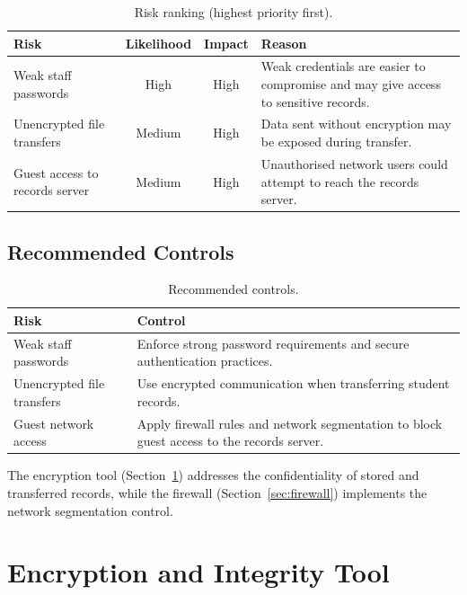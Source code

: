 \documentclass[11pt,a4paper]{article}
\begin{document}
\begin{table}[h!]
\centering
\renewcommand{\arraystretch}{1.3}
\begin{tabular}{@{}p{3.6cm} c c p{6.4cm}@{}}
\toprule
\textbf{Risk} & \textbf{Likelihood} & \textbf{Impact} & \textbf{Reason} \\
\midrule
Weak staff passwords & High & High &
  Weak credentials are easier to compromise and may give access to sensitive records. \\
Unencrypted file transfers & Medium & High &
  Data sent without encryption may be exposed during transfer. \\
Guest access to records server & Medium & High &
  Unauthorised network users could attempt to reach the records server. \\
\bottomrule
\end{tabular}
\caption{Risk ranking (highest priority first).}
\end{table}

\subsection{Recommended Controls}
\begin{table}[h!]
\centering
\renewcommand{\arraystretch}{1.3}
\begin{tabular}{@{}p{4.5cm} p{10cm}@{}}
\toprule
\textbf{Risk} & \textbf{Control} \\
\midrule
Weak staff passwords & Enforce strong password requirements and secure authentication practices. \\
Unencrypted file transfers & Use encrypted communication when transferring student records. \\
Guest network access & Apply firewall rules and network segmentation to block guest access to the records server. \\
\bottomrule
\end{tabular}
\caption{Recommended controls.}
\end{table}

The encryption tool (Section~\ref{sec:tool}) addresses the confidentiality of
stored and transferred records, while the firewall (Section~\ref{sec:firewall})
implements the network segmentation control.

\section{Encryption and Integrity Tool}\label{sec:tool}
\end{document}
